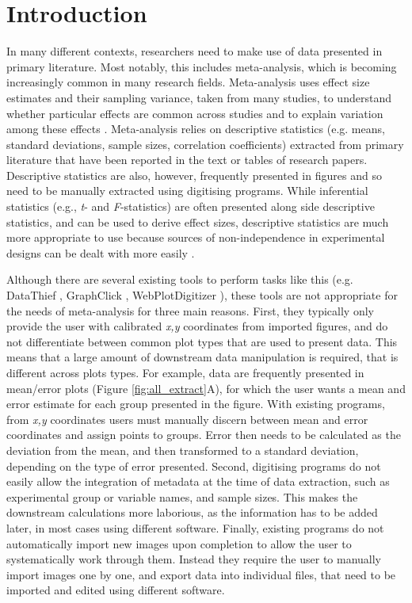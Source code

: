 \documentclass[12pt]{article}
\let\proglang=\textsf
\begin{document}



\section{Introduction}

In many different contexts, researchers need to make use of data presented in primary literature. Most notably, this includes meta-analysis, which is becoming increasingly common in many research fields. Meta-analysis uses effect size estimates and their sampling variance, taken from many studies, to understand whether particular effects are common across studies and to explain variation among these effects \citep{Glass1976,Borenstein2009,Koricheva2013,Naka2017}. Meta-analysis relies on descriptive statistics (e.g. means, standard deviations, sample sizes, correlation coefficients) extracted from primary literature that have been reported in the text or tables of research papers. Descriptive statistics are also, however, frequently presented in figures and so need to be manually extracted using digitising programs. While inferential statistics (e.g., \textit{t}- and \textit{F}-statistics) are often presented along side descriptive statistics, and can be used to derive effect sizes, descriptive statistics are much more appropriate to use because sources of non-independence in experimental designs can be dealt with more easily \citep{Noble2017}. 

Although there are several existing tools to perform tasks like this (e.g. \proglang{DataThief} \citep{DataThief}, \proglang{GraphClick} \citep{GraphClick}, \proglang{WebPlotDigitizer} \citep{WebPlotDigitizer}), these tools are not appropriate for the needs of meta-analysis for three main reasons. First, they typically only provide the user with calibrated \textit{x,y} coordinates from imported figures, and do not differentiate between common plot types that are used to present data. This means that a large amount of downstream data manipulation is required, that is different across plots types. For example, data are frequently presented in mean/error plots (Figure \ref{fig:all_extract}A), for which the user wants a mean and error estimate for each group presented in the figure. With existing programs, from \textit{x,y} coordinates users must manually discern between mean and error coordinates and assign points to groups. Error then needs to be calculated as the deviation from the mean, and then transformed to a standard deviation, depending on the type of error presented. Second, digitising programs do not easily allow the integration of metadata at the time of data extraction, such as experimental group or variable names, and sample sizes. This makes the downstream calculations more laborious, as the information has to be added later, in most cases using different software. Finally, existing programs do not automatically import new images upon completion to allow the user to systematically work through them. Instead they require the user to manually import images one by one, and export data into individual files, that need to be imported and edited using different software. 
\end{document}
